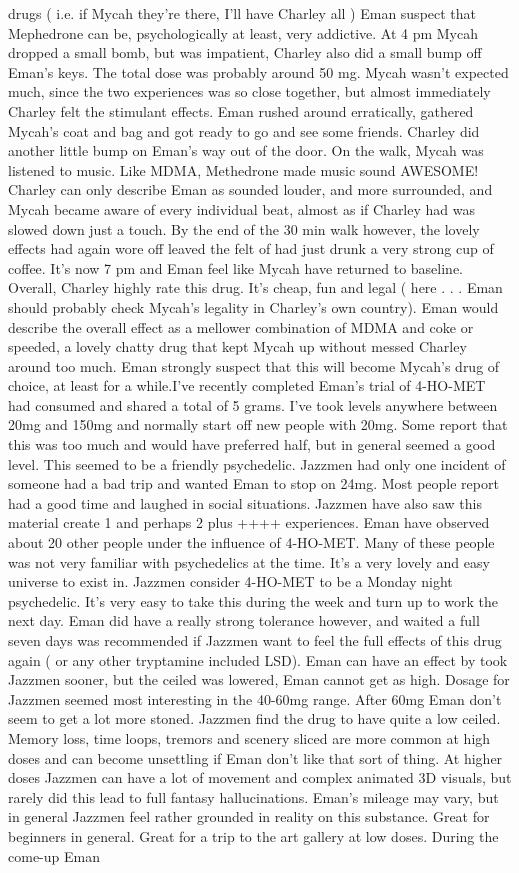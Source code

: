 \documentclass[12pt]{book}
\begin{document}
drugs ( i.e. if Mycah they're there, I'll have Charley all ) Eman suspect that Mephedrone can be, psychologically at least, very addictive. At 4 pm Mycah dropped a small bomb, but was impatient, Charley also did a small bump off Eman's keys. The total dose was probably around 50 mg. Mycah wasn't expected much, since the two experiences was so close together, but almost immediately Charley felt the stimulant effects. Eman rushed around erratically, gathered Mycah's coat and bag and got ready to go and see some friends. Charley did another little bump on Eman's way out of the door. On the walk, Mycah was listened to music. Like MDMA, Methedrone made music sound AWESOME! Charley can only describe Eman as sounded louder, and more surrounded, and Mycah became aware of every individual beat, almost as if Charley had was slowed down just a touch. By the end of the 30 min walk however, the lovely effects had again wore off leaved the felt of had just drunk a very strong cup of coffee. It's now 7 pm and Eman feel like Mycah have returned to baseline. Overall, Charley highly rate this drug. It's cheap, fun and legal ( here . . .  Eman should probably check Mycah's legality in Charley's own country). Eman would describe the overall effect as a mellower combination of MDMA and coke or speeded, a lovely chatty drug that kept Mycah up without messed Charley around too much. Eman strongly suspect that this will become Mycah's drug of choice, at least for a while.I've recently completed Eman's trial of 4-HO-MET had consumed and shared a total of 5 grams. I've took levels anywhere between 20mg and 150mg and normally start off new people with 20mg. Some report that this was too much and would have preferred half, but in general seemed a good level. This seemed to be a friendly psychedelic. Jazzmen had only one incident of someone had a bad trip and wanted Eman to stop on 24mg. Most people report had a good time and laughed in social situations. Jazzmen have also saw this material create 1 and perhaps 2 plus ++++ experiences. Eman have observed about 20 other people under the influence of 4-HO-MET. Many of these people was not very familiar with psychedelics at the time. It's a very lovely and easy universe to exist in. Jazzmen consider 4-HO-MET to be a Monday night psychedelic. It's very easy to take this during the week and turn up to work the next day. Eman did have a really strong tolerance however, and waited a full seven days was recommended if Jazzmen want to feel the full effects of this drug again ( or any other tryptamine included LSD). Eman can have an effect by took Jazzmen sooner, but the ceiled was lowered, Eman cannot get as high. Dosage for Jazzmen seemed most interesting in the 40-60mg range. After 60mg Eman don't seem to get a lot more stoned. Jazzmen find the drug to have quite a low ceiled. Memory loss, time loops, tremors and scenery sliced are more common at high doses and can become unsettling if Eman don't like that sort of thing. At higher doses Jazzmen can have a lot of movement and complex animated 3D visuals, but rarely did this lead to full fantasy hallucinations. Eman's mileage may vary, but in general Jazzmen feel rather grounded in reality on this substance. Great for beginners in general. Great for a trip to the art gallery at low doses. During the come-up Eman 
\end{document}
